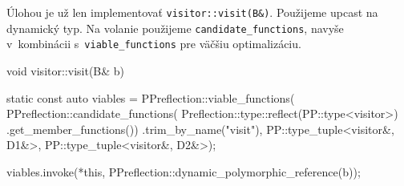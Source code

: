 Úlohou je už len implementovať \texttt{visitor::visit(B\&)}. Použijeme upcast na dynamický typ. Na volanie použijeme \texttt{candidate\_functions}, navyše v~kombinácii s~\texttt{viable\_functions} pre väčšiu optimalizáciu.
\begin{code}[fontsize=\footnotesize]
void visitor::visit(B& b)
{
    static const auto viables = PPreflection::viable_functions(
        PPreflection::candidate_functions(
            Preflection::type::reflect(PP::type<visitor>)
                .get_member_functions())
            .trim_by_name("visit"),
        PP::type_tuple<visitor&, D1&>,
        PP::type_tuple<visitor&, D2&>);

    viables.invoke({*this, PPreflection::dynamic_polymorphic_reference(b)});
}
\end{code}
